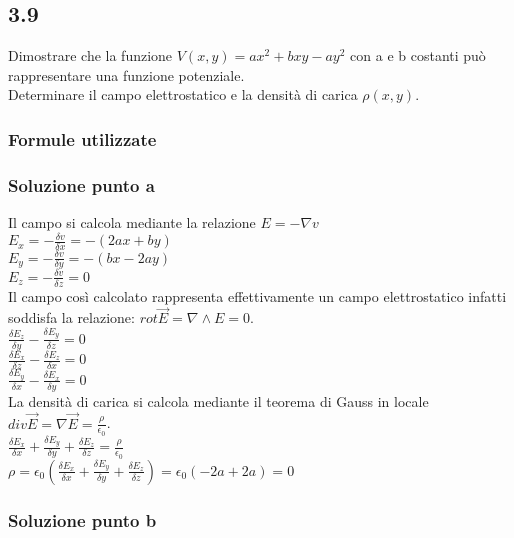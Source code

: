 \documentclass[../../main.tex]{subfiles}
\begin{document}
\subsection*{3.9}
Dimostrare che la funzione $V(x, y) = ax^2+bxy-ay^2$ con a e b costanti può rappresentare una funzione potenziale.
\\Determinare il campo elettrostatico e la densità di carica $\rho(x,y)$.
\subsubsection*{Formule utilizzate}
\subsubsection*{Soluzione punto a}
Il campo si calcola mediante la relazione $E = -\nabla v$
\\$E_x = -\frac{\delta v}{\delta x} = -(2ax+by)$
\\$E_y = -\frac{\delta v}{\delta y} = -(bx-2ay)$
\\$E_z = -\frac{\delta v}{\delta z} = 0$
\\Il campo così calcolato rappresenta effettivamente un campo elettrostatico infatti soddisfa la relazione: $rot\vec{E} = \nabla \wedge  E = 0$.
\\$\frac{\delta E_z}{\delta y} - \frac{\delta E_y}{\delta z} = 0$
\\$\frac{\delta E_x}{\delta z} - \frac{\delta E_z}{\delta x} = 0$
\\$\frac{\delta E_y}{\delta x} - \frac{\delta E_x}{\delta y} = 0$
\\La densità di carica si calcola mediante il teorema di Gauss in locale $div\vec{E} = \nabla \vec{E} = \frac{\rho}{\epsilon_0}$.
\\$\frac{\delta E_x}{\delta x}+\frac{\delta E_y}{\delta y}+\frac{\delta E_z}{\delta z} = \frac{\rho}{\epsilon_0}$
\\$\rho = \epsilon_0\left(\frac{\delta E_x}{\delta x} + \frac{\delta E_y}{\delta y} + \frac{\delta E_z}{\delta z}\right) = \epsilon_0\left(-2a+2a\right) = 0$
\subsubsection*{Soluzione punto b}
\newpage
\end{document}
